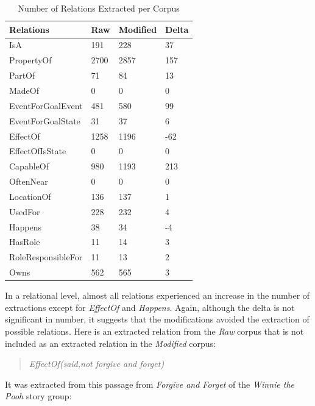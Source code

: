 \begin{table}[H]   %
\centering
\caption{Number of Relations Extracted per Corpus} \vspace{0.25em}
\begin{tabular}{|p{4.5cm}|p{2cm}|p{2cm}|p{2cm}|} \hline
\textbf{Relations} & \textbf{Raw} & \textbf{Modified} & \textbf{Delta} \\ \hline
IsA & 191 & 228 & 37 \\ \hline
PropertyOf & 2700 & 2857 & 157 \\ \hline
PartOf  & 71 & 84 & 13 \\ \hline
MadeOf & 0 & 0 & 0 \\ \hline
EventForGoalEvent & 481 & 580 & 99 \\ \hline
EventForGoalState & 31 & 37 & 6 \\ \hline
EffectOf & 1258 & 1196 & -62 \\ \hline
EffectOfIsState & 0 & 0 & 0 \\ \hline
CapableOf & 980 & 1193 & 213 \\ \hline
OftenNear & 0 & 0 & 0 \\ \hline
LocationOf & 136 & 137 & 1 \\ \hline
UsedFor & 228 & 232 & 4 \\ \hline
Happens & 38 & 34 & -4 \\ \hline
HasRole & 11 & 14 & 3 \\ \hline
RoleResponsibleFor & 11 & 13 & 2 \\ \hline
Owns & 562 & 565 & 3 \\ \hline
\end{tabular}
\label{tab:reltotal}
\end{table}

In a relational level, almost all relations experienced an increase in the number of extractions except for \textit{EffectOf} and \textit{Happens}. Again, although the delta is not significant in number, it suggests that the modifications avoided the extraction of possible relations. Here is an  extracted relation from the \textit{Raw} corpus that is not included as an extracted relation in the \textit{Modified} corpus:

\begin{verse}
\itshape
EffectOf(said,not forgive and forget)
\end{verse}

It was extracted from this passage from \textit{Forgive and Forget} of the \textit{Winnie the Pooh} story group:

